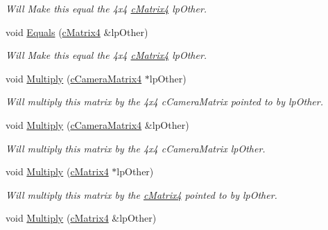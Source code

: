 \begin{DoxyCompactItemize}
\begin{DoxyCompactList}\small\item\em Will Make this equal the 4x4 \hyperlink{classc_matrix4}{cMatrix4} lpOther. \end{DoxyCompactList}\item 
\hypertarget{classc_camera_matrix4_a21037a9e876362aea2c9461f38e50304}{
void \hyperlink{classc_camera_matrix4_a21037a9e876362aea2c9461f38e50304}{Equals} (\hyperlink{classc_matrix4}{cMatrix4} \&lpOther)}
\label{classc_camera_matrix4_a21037a9e876362aea2c9461f38e50304}

\begin{DoxyCompactList}\small\item\em Will Make this equal the 4x4 \hyperlink{classc_matrix4}{cMatrix4} lpOther. \end{DoxyCompactList}\item 
\hypertarget{classc_camera_matrix4_a3856050392bac0f5391a280acc7e1f45}{
void \hyperlink{classc_camera_matrix4_a3856050392bac0f5391a280acc7e1f45}{Multiply} (\hyperlink{classc_camera_matrix4}{cCameraMatrix4} $\ast$lpOther)}
\label{classc_camera_matrix4_a3856050392bac0f5391a280acc7e1f45}

\begin{DoxyCompactList}\small\item\em Will multiply this matrix by the 4x4 cCameraMatrix pointed to by lpOther. \end{DoxyCompactList}\item 
\hypertarget{classc_camera_matrix4_a7a539cb44fa348ad19408ddcb928c49c}{
void \hyperlink{classc_camera_matrix4_a7a539cb44fa348ad19408ddcb928c49c}{Multiply} (\hyperlink{classc_camera_matrix4}{cCameraMatrix4} \&lpOther)}
\label{classc_camera_matrix4_a7a539cb44fa348ad19408ddcb928c49c}

\begin{DoxyCompactList}\small\item\em Will multiply this matrix by the 4x4 cCameraMatrix lpOther. \end{DoxyCompactList}\item 
\hypertarget{classc_camera_matrix4_a7d72fd4af4f6c427a71e7084a10ca1b3}{
void \hyperlink{classc_camera_matrix4_a7d72fd4af4f6c427a71e7084a10ca1b3}{Multiply} (\hyperlink{classc_matrix4}{cMatrix4} $\ast$lpOther)}
\label{classc_camera_matrix4_a7d72fd4af4f6c427a71e7084a10ca1b3}

\begin{DoxyCompactList}\small\item\em Will multiply this matrix by the \hyperlink{classc_matrix4}{cMatrix4} pointed to by lpOther. \end{DoxyCompactList}\item 
\hypertarget{classc_camera_matrix4_a81a6d3f77fb020b58ea788b42f581905}{
void \hyperlink{classc_camera_matrix4_a81a6d3f77fb020b58ea788b42f581905}{Multiply} (\hyperlink{classc_matrix4}{cMatrix4} \&lpOther)}
\label{classc_camera_matrix4_a81a6d3f77fb020b58ea788b42f581905}


\end{DoxyCompactItemize}

